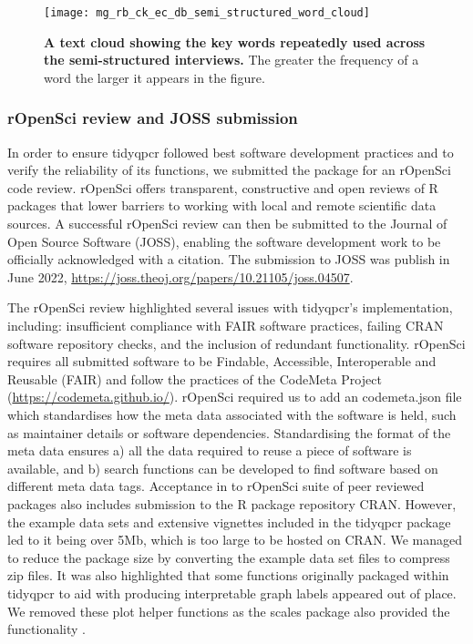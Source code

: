 \documentclass[../main.tex]{subfiles}
\begin{document}
\begin{figure}[t]

{\centering \texttt{[image: mg\_rb\_ck\_ec\_db\_semi\_structured\_word\_cloud]} 

}

\caption[A text cloud showing the key words repeatedly used across the semi-structured interviews.]{\textbf{A text cloud showing the key words repeatedly used across the semi-structured interviews.} The greater the frequency of a word the larger it appears in the figure. }\label{fig:semi-structured-test-cloud}
\end{figure}

\subsubsection{rOpenSci review and JOSS submission}
In order to ensure tidyqpcr followed best software development practices and to verify the reliability of its functions, we submitted the package for an rOpenSci code review. 
rOpenSci offers transparent, constructive and open reviews of R packages that lower barriers to working with local and remote scientific data sources.
A successful rOpenSci review can then be submitted to the Journal of Open Source Software (JOSS), enabling the software development work to be officially acknowledged with a citation.
The submission to JOSS was publish in June 2022, \url{https://joss.theoj.org/papers/10.21105/joss.04507}.

The rOpenSci review highlighted several issues with tidyqpcr's implementation, including: insufficient compliance with FAIR software practices, failing CRAN software repository checks, and the inclusion of redundant functionality. 
rOpenSci requires all submitted software to be Findable, Accessible, Interoperable and Reusable (FAIR) and follow the practices of the CodeMeta Project (\url{https://codemeta.github.io/}).
rOpenSci required us to add an codemeta.json file which standardises how the meta data associated with the software is held, such as maintainer details or software dependencies.
Standardising the format of the meta data ensures a) all the data required to reuse a piece of software is available, and b) search functions can be developed to find software based on different meta data tags.
Acceptance in to rOpenSci suite of peer reviewed packages also includes submission to the R package repository CRAN.
However, the example data sets and extensive vignettes included in the tidyqpcr package led to it being over 5Mb, which is too large to be hosted on CRAN.
We managed to reduce the package size by converting the example data set files to compress zip files.
It was also highlighted that some functions originally packaged within tidyqpcr to aid with producing interpretable graph labels appeared out of place.
We removed these plot helper functions as the scales package also provided the functionality \parencite{Wickham2022}.
\end{document}

